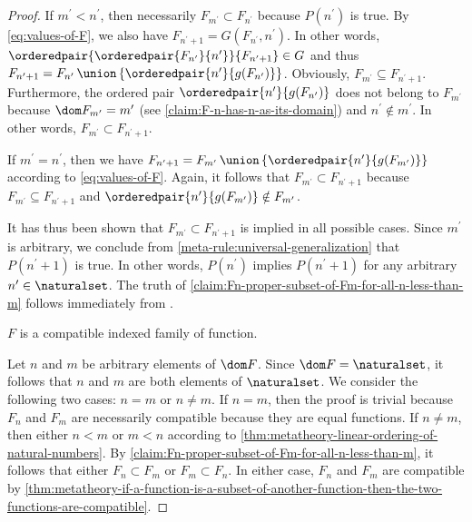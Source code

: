 \begin{proof}
    \vspace{0.3cm}
    \noindent
    If \( m^{\prime} < n^{\prime} \), then necessarily \( F_{m^{\prime}} \subset F_{n^{\prime}} \) because \( P(n^{\prime}) \) is true.
    By \eqref{eq:values-of-F}, we also have \( F_{n^{\prime} + 1} = G(F_{n^{\prime}}, n^{\prime}) \). In other words,
    \( \orderedpair{\orderedpair{F_{n^{\prime}}}{n^{\prime}}}{F_{n^{\prime} + 1}} \in G \) and thus
    \( F_{n^{\prime} + 1} = F_{n^{\prime}} \,{\union}\, \mleft\{ \orderedpair{n^{\prime}}{g(F_{n^{\prime}})} \mright\} \).
    Obviously, \( F_{m^{\prime}} \subseteq F_{n^{\prime} + 1} \). Furthermore, the ordered pair \( \orderedpair{n^{\prime}}{g(F_{n^{\prime}})} \)
    does not belong to \( F_{m^{\prime}} \) because \( \dom F_{m^{\prime}} = m^{\prime} \) (see \cref{claim:F-n-has-n-as-its-domain})
    and \( n^{\prime} \notin m^{\prime} \).
    In other words, \( F_{m^{\prime}} \subset F_{n^{\prime} + 1} \).

    \vspace{0.3cm}
    \noindent
    If \( m^{\prime} = n^{\prime} \), then we have \( F_{n^{\prime} + 1} = F_{m^{\prime}} \,{\union}\, \mleft\{ \orderedpair{n^{\prime}}{g(F_{m^{\prime}})} \mright\} \)
    according to \eqref{eq:values-of-F}.
    Again, it follows that \( F_{m^{\prime}} \subset F_{n^{\prime} + 1} \) because \( F_{m^{\prime}} \subseteq F_{n^{\prime} + 1} \) and
    \( \orderedpair{n^{\prime}}{g(F_{m^{\prime}})} \notin F_{m^{\prime}} \).

    \vspace{0.3cm}
    \noindent
    It has thus been shown that \( F_{m^{\prime}} \subset F_{n^{\prime} + 1} \) is implied in all possible cases.
    Since \( m^{\prime} \) is arbitrary, we conclude from \cref{meta-rule:universal-generalization} that \( P(n^{\prime} + 1) \) is true.
    In other words, \( P(n^{\prime}) \) implies \( P(n^{\prime} + 1) \) for any arbitrary \( n^{\prime} \in \naturalset \).
    The truth of \cref{claim:Fn-proper-subset-of-Fm-for-all-n-less-than-m} follows immediately from .
    \begin{claim}
         \label{claim:F-is-a-compatible-family-of-functions}
        \( F \) is a compatible indexed family of function.
    \end{claim}
    \noindent
    Let \( n \) and \( m \) be arbitrary elements of \( \dom F \).
    Since \( \dom F = \naturalset \), it follows that \( n \) and \( m \) are both elements of \( \naturalset \).
    We consider the following two cases: \( n = m \) or \( n \neq m \).
    If \( n = m \), then the proof is trivial because \( F_{n} \) and \( F_{m} \) are necessarily compatible because they are equal functions.
    If \( n \neq m \), then either \( n < m \) or \( m < n \) according to \cref{thm:metatheory-linear-ordering-of-natural-numbers}.
    By \cref{claim:Fn-proper-subset-of-Fm-for-all-n-less-than-m}, it follows that either \( F_{n} \subset F_{m} \) or \( F_{m} \subset F_{n} \).
    In either case, \( F_{n} \) and \( F_{m} \) are compatible by
    \cref{thm:metatheory-if-a-function-is-a-subset-of-another-function-then-the-two-functions-are-compatible}.


\end{proof}
